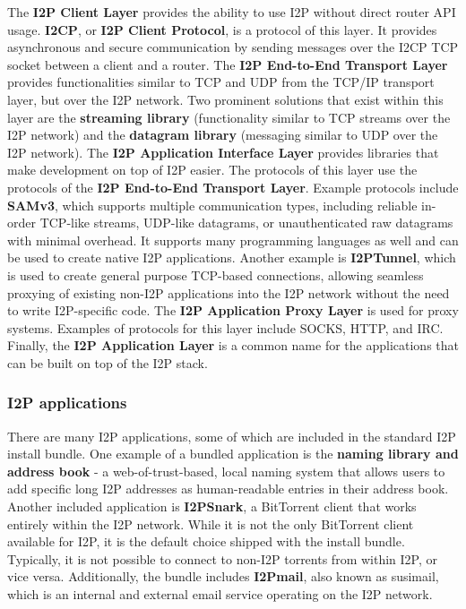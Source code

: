 The \textbf{I2P Client Layer} provides the ability to use I2P without direct router API usage. \textbf{I2CP}, or \textbf{I2P Client Protocol}, is a protocol of this layer. It provides asynchronous and secure communication by sending messages over the I2CP TCP socket between a client and a router. The \textbf{I2P End-to-End Transport Layer} provides functionalities similar to TCP and UDP from the TCP/IP transport layer, but over the I2P network. Two prominent solutions that exist within this layer are the \textbf{streaming library} (functionality similar to TCP streams over the I2P network) and the \textbf{datagram library} (messaging similar to UDP over the I2P network). The \textbf{I2P Application Interface Layer} provides libraries that make development on top of I2P easier. The protocols of this layer use the protocols of the \textbf{I2P End-to-End Transport Layer}. Example protocols include \textbf{SAMv3}, which supports multiple communication types, including reliable in-order TCP-like streams, UDP-like datagrams, or unauthenticated raw datagrams with minimal overhead. It supports many programming languages as well and can be used to create native I2P applications. Another example is \textbf{I2PTunnel}, which is used to create general purpose TCP-based connections, allowing seamless proxying of existing non-I2P applications into the I2P network without the need to write I2P-specific code. The \textbf{I2P Application Proxy Layer} is used for proxy systems. Examples of protocols for this layer include SOCKS, HTTP, and IRC. Finally, the \textbf{I2P Application Layer} is a common name for the applications that can be built on top of the I2P stack.

\subsubsection{I2P applications}

There are many I2P applications, some of which are included in the standard I2P install bundle. One example of a bundled application is the \textbf{naming library and address book} - a web-of-trust-based, local naming system that allows users to add specific long I2P addresses as human-readable entries in their address book. Another included application is \textbf{I2PSnark}, a BitTorrent client that works entirely within the I2P network. While it is not the only BitTorrent client available for I2P, it is the default choice shipped with the install bundle. Typically, it is not possible to connect to non-I2P torrents from within I2P, or vice versa. Additionally, the bundle includes \textbf{I2Pmail}, also known as susimail, which is an internal and external email service operating on the I2P network.

